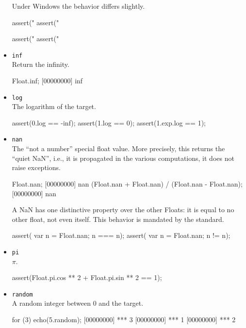 \begin{itemize}
  \begin{windows}
    Under Windows the behavior differs slightly.
  \end{windows}
\begin{urbiscript}[firstnumber=last]
assert("%
assert("%

assert("%
assert("%
\end{urbiscript}

\item \lstinline|inf|\\
  Return the infinity.
\begin{urbiscript}[firstnumber=last]
Float.inf;
[00000000] inf
\end{urbiscript}

\item \lstinline|log|\\
  The logarithm of the target.
\begin{urbiscript}[firstnumber=last]
assert(0.log == -inf);
assert(1.log == 0);
assert(1.exp.log == 1);
\end{urbiscript}

\item \lstinline|nan|\\
  The ``not a number'' special float value.  More precisely, this
  returns the ``quiet NaN'', i.e., it is propagated in the various
  computations, it does not raise exceptions.
\begin{urbiscript}[firstnumber=last]
Float.nan;
[00000000] nan
(Float.nan + Float.nan) / (Float.nan - Float.nan);
[00000000] nan
\end{urbiscript}

A {NaN} has one distinctive property over the other Floats: it is
equal to no other float, not even itself.  This behavior is mandated
by the  standard.
\begin{urbiscript}[firstnumber=last]
assert({ var n = Float.nan; n === n});
assert({ var n = Float.nan; n  != n});
\end{urbiscript}

\item \lstinline|pi|\\
  $\pi$.
\begin{urbiscript}[firstnumber=last]
assert(Float.pi.cos ** 2 + Float.pi.sin ** 2 == 1);
\end{urbiscript}

\item \lstinline|random|\\
  A random integer between 0 and the target.
\begin{urbiscript}[firstnumber=last]
for (3)
  echo(5.random);
[00000000] *** 3
[00000000] *** 1
[00000000] *** 2
\end{urbiscript}


\end{itemize}
